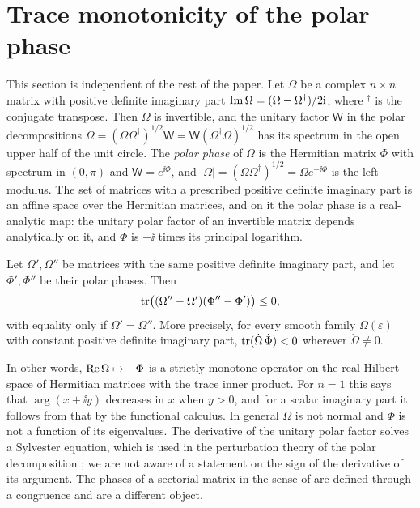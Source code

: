 \section{Trace monotonicity of the polar phase}\label{sec:phase}

This section is independent of the rest of the paper. Let $\Omega$ be a
complex $n\times n$ matrix with positive definite imaginary part
$\operatorname{Im}\Omega=(\Omega-\Omega^\dagger)/2\mathrm i$, where ${}^\dagger$ is the conjugate
transpose. Then $\Omega$ is invertible, and the unitary factor $\mathsf W$ in
the polar decompositions
$\Omega=(\Omega\Omega^\dagger)^{1/2}\mathsf W=\mathsf W(\Omega^\dagger\Omega)^{1/2}$
has its spectrum in the open upper half of the unit circle. The \emph{polar
phase} of $\Omega$ is the Hermitian matrix $\Phi$ with spectrum in $(0,\pi)$
and $\mathsf W=e^{\ii\Phi}$, and $|\Omega|=(\Omega\Omega^\dagger)^{1/2}=\Omega e^{-\ii\Phi}$
is the left modulus. The set of matrices with a prescribed positive definite
imaginary part is an affine space over the Hermitian matrices, and on it the
polar phase is a real-analytic map: the unitary polar factor of an invertible
matrix depends analytically on it, and $\Phi$ is $-\ii$ times its principal
logarithm.

\begin{theorem}\label{thm:phase}
Let $\Omega',\Omega''$ be matrices with the same positive definite imaginary
part, and let $\Phi',\Phi''$ be their polar phases. Then
\[
 \operatorname{tr}\bigl((\Omega''-\Omega')(\Phi''-\Phi')\bigr)\leq0,
\]
with equality only if $\Omega'=\Omega''$. More precisely, for every smooth
family $\Omega(\varepsilon)$ with constant positive definite imaginary part,
$\operatorname{tr}(\dot\Omega\,\dot\Phi)<0$ wherever $\dot\Omega\neq0$.
\end{theorem}

In other words, $\operatorname{Re}\Omega\mapsto-\Phi$ is a strictly monotone operator
\cite{min62} on the real Hilbert space of Hermitian matrices with the trace
inner product.
For $n=1$ this says that $\arg(x+\ii y)$ decreases in $x$ when $y>0$, and for
a scalar imaginary part it follows from that by the functional calculus. In
general $\Omega$ is not normal and $\Phi$ is not a function of its
eigenvalues. The derivative of the unitary polar factor solves a Sylvester
equation, which is used in the perturbation theory of the polar
decomposition \cite{bha97}; we are not aware of a statement on the sign of the derivative
of its argument. The phases of a sectorial matrix in the sense of
\cite{wckq20} are defined through a congruence and are a different object.

